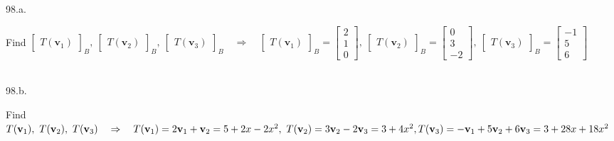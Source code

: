 \documentclass[12pt]{book}
\begin{document}
\begin{CJK}{UTF8}{bsmi}
98.a. \begin{minipage}[t]{\dimexpr\linewidth-2em}
Find $\begin{bmatrix}
T(\textbf{v}_1 )
\end{bmatrix}_B,\ \begin{bmatrix}
T(\textbf{v}_2 )
\end{bmatrix}_B,\ \begin{bmatrix}
T(\textbf{v}_3 )
\end{bmatrix}_B\quad\Rightarrow\quad\begin{bmatrix}
T(\textbf{v}_1 )
\end{bmatrix}_B=\begin{bmatrix}
2\\1\\0
\end{bmatrix},\ \begin{bmatrix}
T(\textbf{v}_2 )
\end{bmatrix}_B=\begin{bmatrix}
0\\3\\-2
\end{bmatrix},\ \begin{bmatrix}
T(\textbf{v}_3 )
\end{bmatrix}_B=\begin{bmatrix}
-1\\5\\6
\end{bmatrix}$
\end{minipage}\\

98.b. \begin{minipage}[t]{\dimexpr\linewidth-2em}
Find $T(\textbf{v}_1),\ T(\textbf{v}_2),\ T(\textbf{v}_3)\quad\Rightarrow\quad T(\textbf{v}_1)=2\textbf{v}_1+\textbf{v}_2=5+2x-2x^2,\ T(\textbf{v}_2)=3\textbf{v}_2-2\textbf{v}_3=3+4x^2,\\ T(\textbf{v}_3)=-\textbf{v}_1+5\textbf{v}_2+6\textbf{v}_3=3+28x+18x^2$
\end{minipage}\\


\end{CJK}
\end{document}
